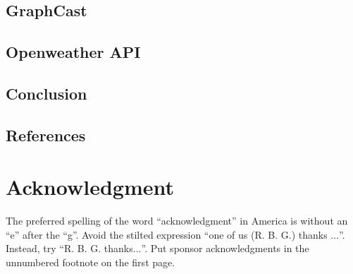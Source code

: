 \documentclass[conference]{IEEEtran}
\begin{document}
\subsection{GraphCast}


\subsection{Openweather API}


\subsection{Conclusion}


\subsection{References}


\section*{Acknowledgment}

The preferred spelling of the word ``acknowledgment'' in America is without
an ``e'' after the ``g''. Avoid the stilted expression ``one of us (R. B.
G.) thanks $\ldots$''. Instead, try ``R. B. G. thanks$\ldots$''. Put sponsor
acknowledgments in the unnumbered footnote on the first page.
\end{document}
